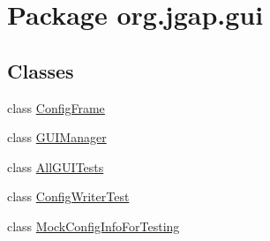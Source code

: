 \hypertarget{namespaceorg_1_1jgap_1_1gui}{\section{Package org.\-jgap.\-gui}
\label{namespaceorg_1_1jgap_1_1gui}
}
\subsection*{Classes}
\begin{DoxyCompactItemize}
\item 
class \hyperlink{classorg_1_1jgap_1_1gui_1_1_config_frame}{Config\-Frame}
\item 
class \hyperlink{classorg_1_1jgap_1_1gui_1_1_g_u_i_manager}{G\-U\-I\-Manager}
\item 
class \hyperlink{classorg_1_1jgap_1_1gui_1_1_all_g_u_i_tests}{All\-G\-U\-I\-Tests}
\item 
class \hyperlink{classorg_1_1jgap_1_1gui_1_1_config_writer_test}{Config\-Writer\-Test}
\item 
class \hyperlink{classorg_1_1jgap_1_1gui_1_1_mock_config_info_for_testing}{Mock\-Config\-Info\-For\-Testing}
\end{DoxyCompactItemize}
